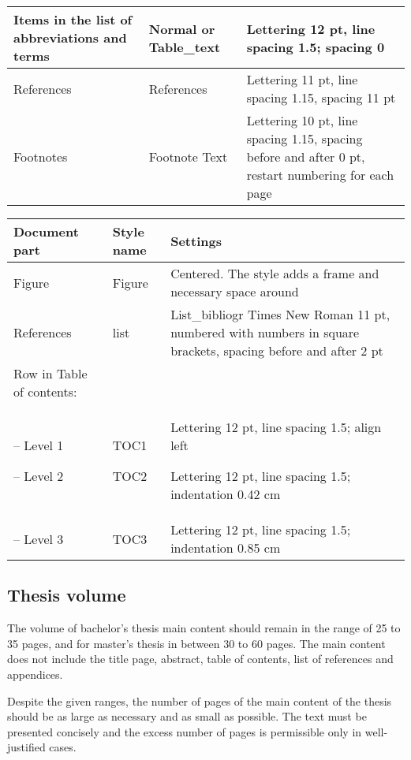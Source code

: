 \begin{table}[!ht]
\begin{tabular}{|L{3.7cm}|L{3.0cm}|L{7.2cm}|}
Items in the list of
abbreviations and terms & Normal or
Table\_text & Lettering 12 pt, line spacing 1.5; spacing 0 \\ \hline

References & References & Lettering 11 pt, line spacing 1.15, spacing
11 pt \\ \hline

Footnotes& Footnote Text &
Lettering 10 pt, line spacing 1.15, spacing
before and after 0 pt, restart numbering for
each page \\ \hline

\end{tabular}
\end{table}


\begin{table}[!ht]
\centering
\begin{tabular}{|L{3.7cm}|L{3.0cm}|L{7.2cm}|}
\hline
\textbf{Document part} & \textbf{Style name} & \textbf{Settings}\\  \hline
Figure &  Figure & Centered. The style adds a frame and necessary space around \\ \hline

References &list & List\_bibliogr Times New Roman 11 pt, numbered with
numbers in square brackets, spacing before and
after 2 pt \\ \hline

Row in Table of
contents: & & \\
 
-- Level 1 

-- Level 2 & TOC1 

TOC2	&	Lettering 12 pt, line spacing 1.5; align left  

Lettering 12 pt, line spacing 1.5;
indentation 0.42 cm \\

-- Level 3 &  TOC3 &	Lettering 12 pt, line spacing 1.5;
indentation 0.85 cm \\ \hline
\end{tabular}
\end{table}
\subsection{Thesis volume}

The volume of bachelor’s thesis main content should remain in the range of 25 to 35 pages, and for master’s thesis in between 30 to 60 pages. The main content does not include the title page, abstract, table of contents, list of references and appendices.

Despite the given ranges, the number of pages of the main content of the thesis should be as large as necessary and as small as possible. The text must be presented concisely and
the excess number of pages is permissible only in well-justified cases.
